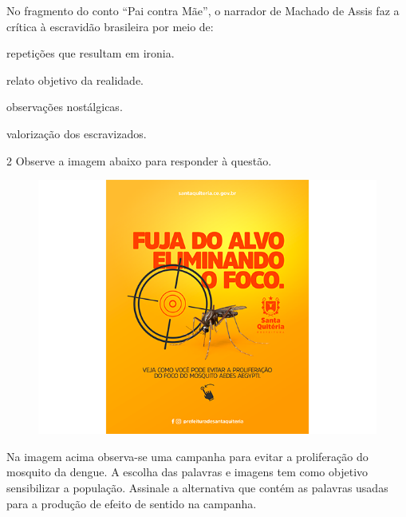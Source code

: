 No fragmento do conto ``Pai contra Mãe'', o narrador de Machado de Assis faz a crítica
à escravidão brasileira por meio de:

\begin{escolha}

  \item repetições que resultam em ironia.
  
  \item relato objetivo da realidade.
  
  \item observações nostálgicas. 
  
  \item valorização dos escravizados. 

\end{escolha}

\num{2} Observe a imagem abaixo para responder à questão.

\begin{figure}[htpb!]
\includegraphics[width=\textwidth]{./imgSAEB_7_POR/media/image6.png}
\end{figure}


Na imagem acima observa-se uma campanha para evitar a proliferação do
mosquito da dengue. A escolha das palavras e imagens tem como objetivo
sensibilizar a população. Assinale a alternativa que contém as palavras
usadas para a produção de efeito de sentido na campanha. 

